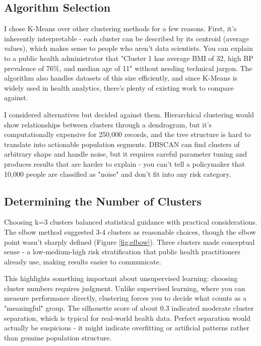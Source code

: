 \documentclass[12pt,a4paper]{article}
\begin{document}
\subsection{Algorithm Selection}

I chose K-Means over other clustering methods for a few reasons. First, it's inherently interpretable - each cluster can be described by its centroid (average values), which makes sense to people who aren't data scientists. You can explain to a public health administrator that "Cluster 1 has average BMI of 32, high BP prevalence of 76\%, and median age of 11" without needing technical jargon. The algorithm also handles datasets of this size efficiently, and since K-Means is widely used in health analytics, there's plenty of existing work to compare against.

I considered alternatives but decided against them. Hierarchical clustering would show relationships between clusters through a dendrogram, but it's computationally expensive for 250,000 records, and the tree structure is hard to translate into actionable population segments. DBSCAN can find clusters of arbitrary shape and handle noise, but it requires careful parameter tuning and produces results that are harder to explain - you can't tell a policymaker that 10,000 people are classified as "noise" and don't fit into any risk category.

\subsection{Determining the Number of Clusters}

Choosing k=3 clusters balanced statistical guidance with practical considerations. The elbow method suggested 3-4 clusters as reasonable choices, though the elbow point wasn't sharply defined (Figure \ref{fig:elbow}). Three clusters made conceptual sense - a low-medium-high risk stratification that public health practitioners already use, making results easier to communicate.

This highlights something important about unsupervised learning: choosing cluster numbers requires judgment. Unlike supervised learning, where you can measure performance directly, clustering forces you to decide what counts as a "meaningful" group. The silhouette score of about 0.3 indicated moderate cluster separation, which is typical for real-world health data. Perfect separation would actually be suspicious - it might indicate overfitting or artificial patterns rather than genuine population structure.
\end{document}
